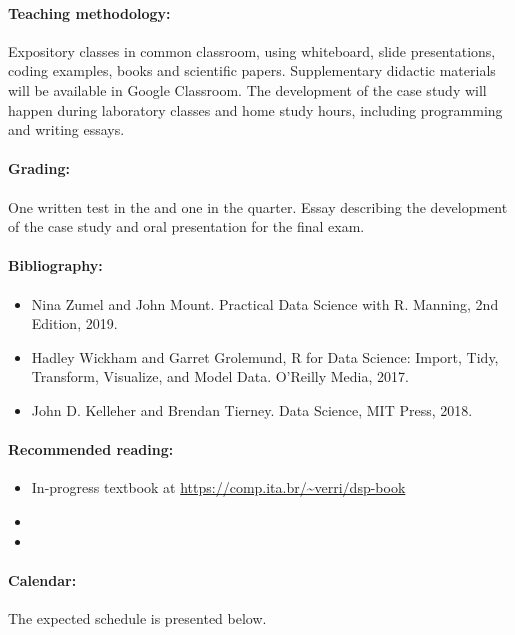 \paragraph{Teaching methodology:}
Expository classes in common classroom, using whiteboard, slide presentations, coding
examples, books and scientific papers. Supplementary didactic materials will be available
in Google Classroom. The development of the case study will happen during laboratory
classes and home study hours, including programming and writing essays.

\paragraph{Grading:} One written test in the  and one in the  quarter.
Essay describing the development of the case study and oral presentation for the final
exam.

\paragraph{Bibliography:}
\begin{itemize}
  \item Nina Zumel and John Mount. Practical Data Science with R. Manning, 2nd Edition, 2019.
  \item Hadley Wickham and Garret Grolemund, R for Data Science: Import, Tidy, Transform, Visualize, and Model Data. O’Reilly Media, 2017.
  \item John D. Kelleher and Brendan Tierney. Data Science, MIT Press, 2018.
\end{itemize}

\thispagestyle{empty}
\paragraph{Recommended reading:}
\begin{itemize}
  \item In-progress textbook at \url{https://comp.ita.br/~verri/dsp-book}
  \item {}
  \item {}
\end{itemize}

\paragraph{Calendar:} The expected schedule is presented below.

